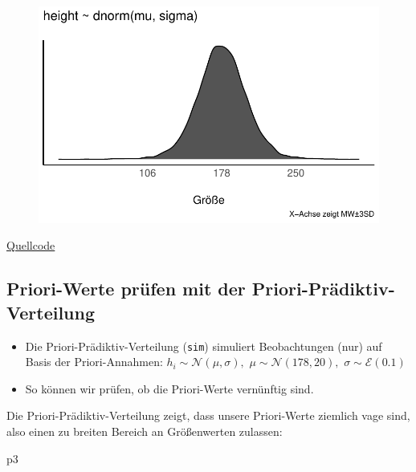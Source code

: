 \documentclass[
  a4paper,
  DIV=11]{scrreprt}
\newenvironment{Shaded}{\begin{snugshade}}{\end{snugshade}}
\newcommand{\NormalTok}[1]{\textcolor[rgb]{0.00,0.23,0.31}{#1}}
\providecommand{\tightlist}{%
  \setlength{\itemsep}{0pt}\setlength{\parskip}{0pt}}\usepackage{longtable,booktabs,array}
\theoremstyle{definition}
\theoremstyle{remark}
\begin{document}
\begin{figure}[H]

{\centering \includegraphics{./gauss_files/figure-pdf/Kung-12-1.pdf}

}

\end{figure}

\href{https://bookdown.org/content/4857/geocentric-models.html\#a-gaussian-model-of-height}{Quellcode}

\hypertarget{priori-werte-pruxfcfen-mit-der-priori-pruxe4diktiv-verteilung}{%
\subsection{Priori-Werte prüfen mit der
Priori-Prädiktiv-Verteilung}\label{priori-werte-pruxfcfen-mit-der-priori-pruxe4diktiv-verteilung}}

\begin{itemize}
\tightlist
\item
  Die Priori-Prädiktiv-Verteilung (\texttt{sim}) simuliert Beobachtungen
  (nur) auf Basis der Priori-Annahmen:
  \(h_i \sim \mathcal{N}(\mu, \sigma),\)
  \(\mu \sim \mathcal{N}(178, 20),\) \(\sigma \sim \mathcal{E}(0.1)\)
\item
  So können wir prüfen, ob die Priori-Werte vernünftig sind.
\end{itemize}

Die Priori-Prädiktiv-Verteilung zeigt, dass unsere Priori-Werte ziemlich
vage sind, also einen zu breiten Bereich an Größenwerten zulassen:

\begin{Shaded}
\begin{Highlighting}[]
\NormalTok{p3}
\end{Highlighting}
\end{Shaded}
\end{document}
